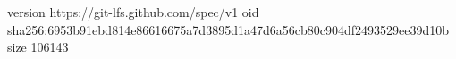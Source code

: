 version https://git-lfs.github.com/spec/v1
oid sha256:6953b91ebd814e86616675a7d3895d1a47d6a56cb80c904df2493529ee39d10b
size 106143
